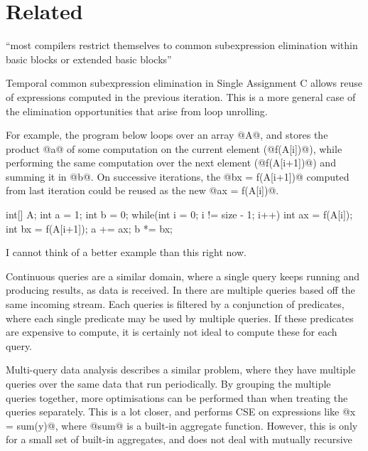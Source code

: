 \section{Related}
\label{s:Related}

``most compilers restrict themselves to common subexpression elimination within basic blocks or extended basic blocks''
\cite{debray1992compiler}

Temporal common subexpression elimination in Single Assignment C
allows reuse of expressions computed in the previous iteration\cite{imlig2001loop}.
This is a more general case of the elimination opportunities that arise from loop unrolling.

For example, the program below loops over an array @A@, and stores the product @a@ of some computation on the current element (@f(A[i])@), while performing the same computation over the next element (@f(A[i+1])@) and summing it in @b@.
On successive iterations, the @bx = f(A[i+1])@ computed from last iteration could be reused as the new @ax = f(A[i])@.
\begin{code}
int[] A;
int a = 1;
int b = 0;
while(int i = 0; i != size - 1; i++)  {
  int ax = f(A[i]);
  int bx = f(A[i+1]);
  a += ax;
  b *= bx;
}
\end{code}

I cannot think of a better example than this right now.

Continuous queries are a similar domain, where a single query keeps running and producing results, as data is received.
In \cite{munagala2007optimization} there are multiple queries based off the same incoming stream.
Each queries is filtered by a conjunction of predicates, where each single predicate may be used by multiple queries.
If these predicates are expensive to compute, it is certainly not ideal to compute these for each query.

Multi-query data analysis\cite{andrade2003efficient} describes a similar problem, where they have multiple queries over the same data that run periodically.
By grouping the multiple queries together, more optimisations can be performed than when treating the queries separately.
This is a lot closer, and performs CSE on expressions like @x = sum(y)@, where @sum@ is a built-in aggregate function.
However, this is only for a small set of built-in aggregates, and does not deal with mutually recursive

